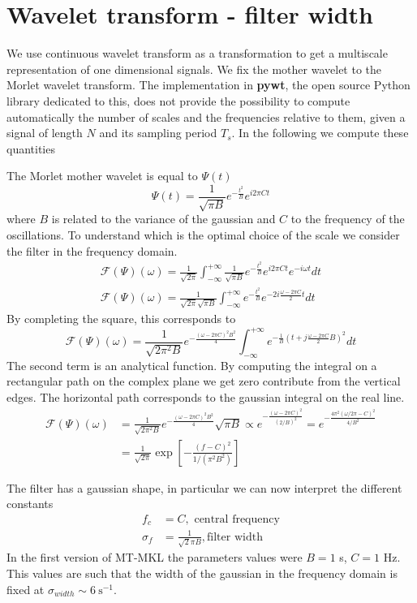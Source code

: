 \documentclass[a4paper]{article}
\begin{document}
\section{Wavelet transform - filter width}\label{sec:wavelet_filter}
We use continuous wavelet transform as a transformation to get a multiscale representation of one dimensional signals. We fix the mother wavelet to the Morlet wavelet transform. The implementation in \textbf{pywt}, the open source Python library dedicated to this, does not provide the possibility to compute automatically the number of scales and the frequencies relative to them, given a signal of length $N$ and its sampling period $T_s$. In the following we compute these quantities

The Morlet mother wavelet is equal to $\Psi(t)$
\begin{equation}
  \Psi(t) = \frac{1}{\sqrt{\pi B}} e^{-\frac{t^2}{B}}e^{i 2 \pi C t}
\end{equation}
where $B$ is related to the variance of the gaussian and $C$ to the frequency of the oscillations. To understand which is the optimal choice of the scale we consider the filter in the frequency domain.
\begin{align*}
\mathcal{F}(\Psi)(\omega) = \frac{1}{\sqrt{2\pi}}\int_{-\infty}^{+\infty} \frac{1}{\sqrt{\pi B}}e^{-\frac{t^2}{B}}e^{i 2 \pi C t} e^{-i\omega t}dt \\
\mathcal{F}(\Psi)(\omega) = \frac{1}{\sqrt{2\pi}\sqrt{\pi B}}\int_{-\infty}^{+\infty} e^{-\frac{t^2}{B}} e^{-2i\frac{\omega - 2 \pi C}{2} t}  dt
\end{align*}
By completing the square, this corresponds to
$$ \mathcal{F}(\Psi)(\omega) = \frac{1}{\sqrt{2\pi^2 B}} e^{-\frac{(\omega - 2\pi C)^2B^2}{4}}\int_{-\infty}^{+\infty} e^{-\frac{1}{B}\left(t + j\frac{\omega - 2\pi C}{2}B\right)^2}dt $$
The second term is an analytical function. By computing the integral on a rectangular path on the complex plane we get zero contribute from the vertical edges. The horizontal path corresponds to the gaussian integral on the real line.
\begin{align}
\mathcal{F}(\Psi)(\omega) &= \frac{1}{\sqrt{2\pi^2 B}} e^{-\frac{(\omega - 2\pi C)^2B^2}{4}}  \sqrt{\pi B} \propto  e^{-\frac{(\omega - 2\pi C)^2}{(2/B)^2}}  = e^{-\frac{4\pi^2(\omega/2\pi - C)^2}{4/B^2}} \\
&= \frac{1}{\sqrt{2\pi}}\exp\left[-\frac{(f-C)^2}{1/(\pi^2 B^2)}\right]
\end{align}

The filter has a gaussian shape, in particular we can now interpret the different constants
\begin{align*}
f_c & = C, \text{ central frequency}\\
\sigma_f & = \frac{1}{\sqrt{2}\pi B}, \text{filter width}
\end{align*}
In the first version of MT-MKL the parameters values were $B=1$ s, $C=1$ Hz.
This values are such that the width of the gaussian in the frequency domain is fixed at $\sigma_{width}\sim6\ \text{s}^{-1}$.
\end{document}
